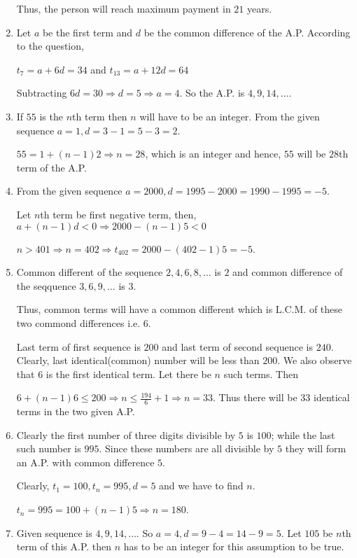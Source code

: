 \begin{enumerate}
  Thus, the person will reach maximum payment in $21$ years.
\item Let $a$ be the first term and $d$ be the common difference of the A.P. According to the question,

  $t_7 = a + 6d = 34$ and $t_{13} = a + 12d = 64$

  Subtracting $6d = 30 \Rightarrow d = 5 \Rightarrow a = 4$. So the A.P. is $4, 9, 14, \ldots$.
\item If $55$ is the $n$th term then $n$ will have to be an integer. From the given sequence $a = 1, d = 3 - 1 = 5 - 3 = 2$.

  $55 = 1 + (n - 1)2 \Rightarrow n = 28$, which is an integer and hence, $55$ will be $28$th term of the A.P.
\item From the given sequence $a = 2000, d = 1995 - 2000 = 1990 - 1995 = -5$.

  Let $n$th term be first negative term, then, $a + (n - 1)d < 0 \Rightarrow 2000 -(n - 1)5 < 0$

  \Rightarrow $n > 401 \Rightarrow n = 402 \Rightarrow t_{402} = 2000 - (402 - 1)5 = -5$.
\item Common different of the sequence $2, 4, 6, 8, \ldots$ is $2$ and common difference of the seqquence $3, 6, 9, \ldots$ is $3$.

  Thus, common terms will have a common different which is L.C.M. of these two commond differences i.e. $6$.

  Last term of first sequence is $200$ and last term of second sequence is $240$. Clearly, last identical(common) number will be
  less than $200$. We also observe that $6$ is the first identical term. Let there be $n$ such terms. Then

  $6 + (n - 1)6 \leq 200 \Rightarrow n\leq \frac{194}{6} + 1 \Rightarrow n = 33$. Thus there will be $33$ identical terms in the two
  given A.P.
\item Clearly the first number of three digits divisible by $5$ is $100$; while the last such number is $995$. Since these numbers
  are all divisible by $5$ they will form an A.P. with common difference $5$.

  Clearly, $t_1 = 100, t_n = 995, d = 5$ and we have to find $n$.

  $t_n = 995 = 100 + (n - 1)5\Rightarrow n = 180$.
\item Given sequence is $4, 9, 14, \ldots$. So $a = 4, d = 9 - 4 = 14 - 9 = 5$. Let $105$ be $n$th term of this A.P. then $n$ has
  to be an integer for this assumption to be true.


\end{enumerate}

